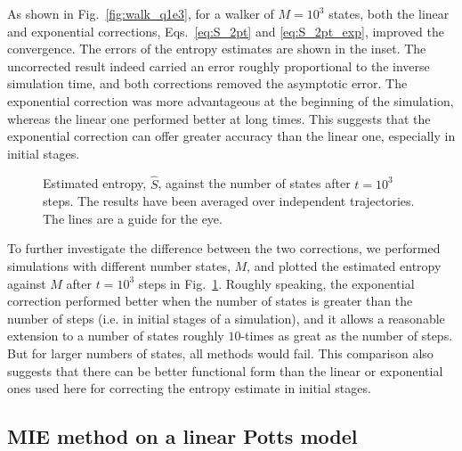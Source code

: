 \documentclass[reprint, superscriptaddress]{revtex4-1}
\begin{document}
As shown in Fig.~\ref{fig:walk_q1e3}, for a walker of $M = 10^3$ states,
both the linear and exponential corrections,
Eqs.~\eqref{eq:S_2pt} and \eqref{eq:S_2pt_exp},
improved the convergence.
%
The errors of the entropy estimates are shown in the inset.
%
The uncorrected result
indeed carried an error roughly proportional to the inverse simulation time,
and both corrections removed the asymptotic error.
%
The exponential correction was more advantageous
at the beginning of the simulation,
whereas the linear one performed better at long times.
%
This suggests that the exponential correction
can offer greater accuracy than the linear one,
especially in initial stages.


\begin{figure}[h]\centering
  \caption{
    \label{fig:walk_Svsq}
    Estimated entropy, $\hat S$,
    against the number of states
    after $t = 10^3$ steps.
    The results have been averaged over independent trajectories.
    The lines are a guide for the eye.
  }
\end{figure}

To further investigate the difference between the two corrections,
we performed simulations with different number states, $M$,
and plotted the estimated entropy against $M$
after $t = 10^3$ steps in Fig.~\ref{fig:walk_Svsq}.
%
Roughly speaking, the exponential correction performed better
when the number of states is greater than the number of steps
(i.e. in initial stages of a simulation),
and it allows a reasonable extension to
a number of states roughly $10$-times as great as the number of steps.
%
But for larger numbers of states, all methods would fail.
%
This comparison also suggests that there can be
better functional form than the linear or exponential ones used here
for correcting the entropy estimate in initial stages.



\subsection{MIE method on a linear Potts model}
\end{document}
